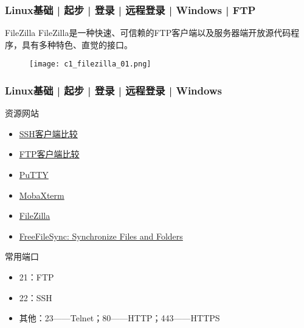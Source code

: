 \begin{frame}
  \frametitle{Linux基础 | 起步 | 登录 | 远程登录 | Windows | FTP}
  \begin{block}{FileZilla}
    FileZilla是一种快速、可信赖的FTP客户端以及服务器端开放源代码程序，具有多种特色、直觉的接口。
  \end{block}
  \begin{figure}
    \centering
    \texttt{[image: c1\_filezilla\_01.png]}
  \end{figure}
\end{frame}

\begin{frame}
  \frametitle{Linux基础 | 起步 | 登录 | 远程登录 | Windows}
  \begin{block}{资源网站}
    \begin{itemize}
      \item \href{https://www.wikiwand.com/zh-cn/SSH\%E5\%AE\%A2\%E6\%88\%B7\%E7\%AB\%AF\%E6\%AF\%94\%E8\%BE\%83}{SSH客户端比较}
      \item \href{https://www.wikiwand.com/zh-cn/FTP\%E5\%AE\%A2\%E6\%88\%B7\%E7\%AB\%AF\%E6\%AF\%94\%E8\%BE\%83}{FTP客户端比较}
      \item \href{https://www.putty.org/}{PuTTY}
      \item \href{https://mobaxterm.mobatek.net/}{MobaXterm}
      \item \href{https://filezilla-project.org/}{FileZilla}
      \item \href{https://freefilesync.org/}{FreeFileSync: Synchronize Files and Folders}
    \end{itemize}
  \end{block}
  \pause
  \begin{block}{常用端口}
    \begin{itemize}
      \item 21：FTP
      \item 22：SSH
      \item 其他：23——Telnet；80——HTTP；443——HTTPS
    \end{itemize}
  \end{block}
\end{frame}

